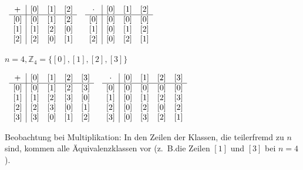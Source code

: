 \documentclass[a5paper, 10pt]{book}
\begin{document}
				\begin{center}
					$
					\begin{array}{cc}
						\begin{array}{c|ccc}
							+	& [0] & [1] & [2]\\
							\hline
							[0]	& [0] & [1] & [2]\\\relax
							[1] & [1] & [2] & [0]\\\relax
							[2] & [2] & [0] & [1]
						\end{array}
						&
						\begin{array}{c|ccc}
							\cdot& [0] & [1] & [2]\\
							\hline
							[0]	& [0] & [0] & [0]\\\relax
							[1] & [0] & [1] & [2]\\\relax
							[2] & [0] & [2] & [1]
						\end{array}
					\end{array}
					$
				\end{center}
				
				$n=4, \mathbb{Z}_4 = \{[0], [1], [2], [3] \}$
				
				\begin{center}
					$
					\begin{array}{cc}
						\begin{array}{c|cccc}
						+	& [0] & [1] & [2] & [3]\\
						\hline
						[0]	& [0] & [1] & [2] & [3]\\\relax
						[1] & [1] & [2] & [3] & [0]\\\relax
						[2] & [2] & [3] & [0] & [1]\\\relax
						[3] & [3] & [0] & [1] & [2]
						\end{array}
						&
						\begin{array}{c|cccc}
						\cdot& [0] & [1] & [2] & [3]\\
						\hline
						[0]	& [0] & [0] & [0] & [0]\\\relax
						[1] & [0] & [1] & [2] & [3]\\\relax
						[2] & [0] & [2] & [0] & [2]\\\relax
						[3] & [0] & [3] & [2] & [1]
						\end{array}
					\end{array}
					$
				\end{center}
				Beobachtung bei Multiplikation: In den Zeilen der Klassen, die teilerfremd zu $n$ sind, kommen alle Äquivalenzklassen vor (z.~B.die Zeilen $[1]$ und $[3]$ bei $n=4$).
				
\end{document}
